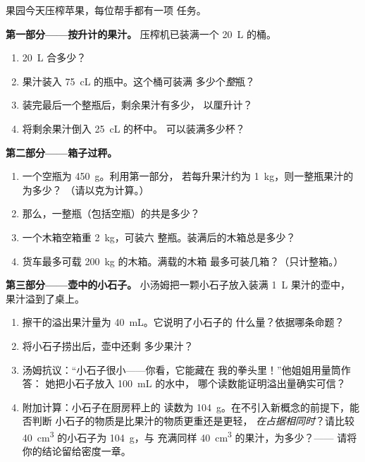 \begin{problem}\label{pb:g6:mass-and-volume:1}
果园今天压榨苹果，每位帮手都有一项
任务。

\medskip\noindent\textbf{第一部分——按升计的果汁。}
压榨机已装满一个 \qty{20}{L} 的桶。
\begin{enumerate}
  \item \qty{20}{L} 合多少？
  \item 果汁装入 \qty{75}{cL} 的瓶中。这个桶可装满
        多少个\emph{整}瓶？
  \item 装完最后一个整瓶后，剩余果汁有多少，
        以厘升计？
  \item 将剩余果汁倒入 \qty{25}{cL} 的杯中。
        可以装满多少杯？
\end{enumerate}

\medskip\noindent\textbf{第二部分——箱子过秤。}
\begin{enumerate}[resume]
  \item 一个空瓶为 \qty{450}{g}。利用第一部分，
        若每升果汁约为 \qty{1}{kg}，则一整瓶果汁的为多少？
        （请以克为计算。）
  \item 那么，一整瓶（包括空瓶）的共是多少？
  \item 一个木箱空箱重 \qty{2}{kg}，可装六
        整瓶。装满后的木箱总是多少？
  \item 货车最多可载 \qty{200}{kg} 的木箱。满载的木箱
        最多可装几箱？（只计整箱。）
\end{enumerate}

\medskip\noindent\textbf{第三部分——壶中的小石子。}
小汤姆把一颗小石子放入装满 \qty{1}{L} 果汁的壶中，
果汁溢到了桌上。
\begin{enumerate}[resume]
  \item 擦干的溢出果汁量为 \qty{40}{mL}。它说明了小石子的
        什么量？依据哪条命题？
  \item 将小石子捞出后，壶中还剩
        多少果汁？
  \item 汤姆抗议：“小石子很小——你看，它能藏在
        我的拳头里！”他姐姐用量筒作答：
        她把小石子放入 \qty{100}{mL} 的水中，
        哪个读数能证明溢出量确实可信？
  \item 附加计算：小石子在厨房秤上的
        读数为 \qty{104}{g}。在不引入新概念的前提下，能否判断
        小石子的物质是比果汁的物质更重还是更轻，
        \emph{在占据相同时}？请比较
        \qty{40}{cm^3} 的小石子为 \qty{104}{g}，与
        充满同样 \qty{40}{cm^3} 的果汁，为多少？——
        请将你的结论留给密度一章。
\end{enumerate}
\end{problem}
